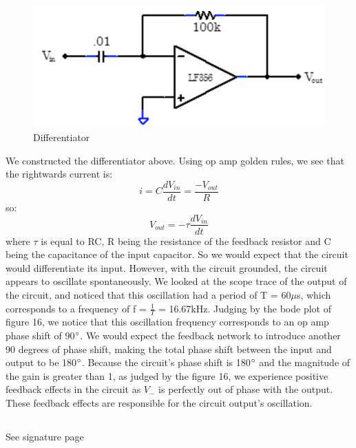 \documentclass{article}
\begin{document}
\subsection{}
    \begin{figure}[H]
        \centering
        \includegraphics[scale = 0.5]{15.png}
        \caption{Differentiator \cite{lab8}}
        \label{fig:my_label}
    \end{figure}
    We constructed the differentiator above. Using op amp golden rules, we see that the rightwards current is:
    \begin{equation}
        i = C\frac{dV_{in}}{dt} = \frac{-V_{out}}{R}
    \end{equation}
    so:
    \begin{equation}
        V_{out} = -\tau \frac{dV_{in}}{dt}
    \end{equation}
    where $\tau$ is equal to RC, R being the resistance of the feedback resistor and C being the capacitance of the input capacitor. So we would expect that the circuit would differentiate its input. However, with the circuit grounded, the circuit appears to oscillate spontaneously. We looked at the scope trace of the output of the circuit, and noticed that this oscillation had a period of T = 60$\mu$s, which corresponds to a frequency of f = $\frac{1}{T}$ = 16.67kHz. Judging by the bode plot of figure 16, we notice that this oscillation frequency corresponds to an op amp phase shift of 90$\degree$. We would expect the feedback network to introduce another 90 degrees of phase shift, making the total phase shift between the input and output to be 180$\degree$. Because the circuit's phase shift is 180$\degree$ and the magnitude of the gain is greater than 1, as judged by the figure 16, we experience positive feedback effects in the circuit as $V_-$ is perfectly out of phase with the output. These feedback effects are responsible for the circuit output's oscillation.

\subsection{}
    See signature page
\end{document}
